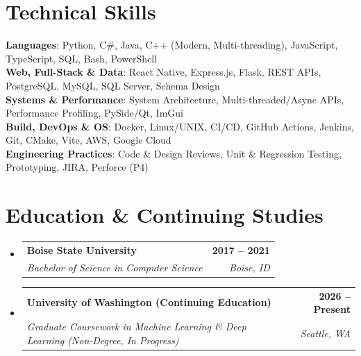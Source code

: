 \documentclass[letterpaper,11pt]{article}
\makeatletter
\newcommand{\resumeSubheading}[4]{
  \vspace{-2pt}\item
    \begin{tabular*}{1.0\textwidth}[t]{l@{\extracolsep{\fill}}r}
      \textbf{#1} & \textbf{\small #2} \\
      \textit{\small#3} & \textit{\small #4} \\
    \end{tabular*}\vspace{-7pt}
}
\newcommand{\resumeSubHeadingListStart}{\begin{itemize}[leftmargin=0.0in, label={}]}
\newcommand{\resumeSubHeadingListEnd}{\end{itemize}}
\makeatother
\begin{document}
\section{Technical Skills}
 \begin{itemize}[leftmargin=0.15in, label={}]
    \small{\item{
     \textbf{Languages}{: Python, C\#, Java, C++ (Modern, Multi-threading), JavaScript, TypeScript, SQL, Bash, PowerShell} \\
     \textbf{Web, Full-Stack \& Data}{: React Native, Express.js, Flask, REST APIs, PostgreSQL, MySQL, SQL Server, Schema Design} \\
     \textbf{Systems \& Performance}{: System Architecture, Multi-threaded/Async APIs, Performance Profiling, PySide/Qt, ImGui} \\
     \textbf{Build, DevOps \& OS}{: Docker, Linux/UNIX, CI/CD, GitHub Actions, Jenkins, Git, CMake, Vite, AWS, Google Cloud} \\
     \textbf{Engineering Practices}{: Code \& Design Reviews, Unit \& Regression Testing, Prototyping, JIRA, Perforce (P4)}
    }}
 \end{itemize}
 \vspace{-12pt}

\section{Education \& Continuing Studies}
  \resumeSubHeadingListStart
    \resumeSubheading
      {Boise State University}{2017 -- 2021}
      {Bachelor of Science in Computer Science}{Boise, ID}
    \resumeSubheading
      {University of Washington (Continuing Education)}{2026 -- Present}
      {Graduate Coursework in Machine Learning \& Deep Learning (Non-Degree, In Progress)}{Seattle, WA}
  \resumeSubHeadingListEnd
\end{document}
